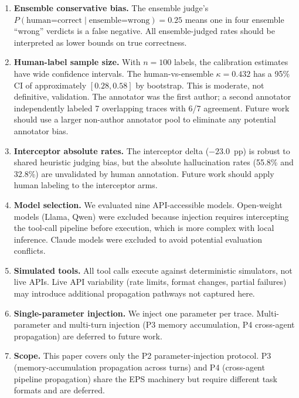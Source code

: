 \documentclass[11pt]{article}
\begin{document}
\begin{enumerate}
  \item \textbf{Ensemble conservative bias.}
    The ensemble judge's $P(\text{human=correct} \mid
    \text{ensemble=wrong})=0.25$ means one in four ensemble ``wrong''
    verdicts is a false negative.
    All ensemble-judged rates should be interpreted as lower bounds on
    true correctness.

  \item \textbf{Human-label sample size.}
    With $n{=}100$ labels, the calibration estimates have wide confidence
    intervals.
    The human-vs-ensemble $\kappa{=}0.432$ has a 95\% CI of approximately
    $[0.28, 0.58]$ by bootstrap.
    This is moderate, not definitive, validation.
    The annotator was the first author; a second annotator independently
    labeled 7 overlapping traces with 6/7 agreement.
    Future work should use a larger non-author annotator pool to
    eliminate any potential annotator bias.

  \item \textbf{Interceptor absolute rates.}
    The interceptor delta ($-23.0$~pp) is robust to shared heuristic
    judging bias, but the absolute hallucination rates (55.8\% and
    32.8\%) are unvalidated by human annotation.
    Future work should apply human labeling to the interceptor arms.

  \item \textbf{Model selection.}
    We evaluated nine API-accessible models.
    Open-weight models (Llama, Qwen) were excluded because injection
    requires intercepting the tool-call pipeline before execution, which
    is more complex with local inference.
    Claude models were excluded to avoid potential evaluation conflicts.

  \item \textbf{Simulated tools.}
    All tool calls execute against deterministic simulators, not live
    APIs.
    Live API variability (rate limits, format changes, partial failures)
    may introduce additional propagation pathways not captured here.

  \item \textbf{Single-parameter injection.}
    We inject one parameter per trace.
    Multi-parameter and multi-turn injection (P3 memory accumulation,
    P4 cross-agent propagation) are deferred to future work.

  \item \textbf{Scope.}
    This paper covers only the P2 parameter-injection protocol.
    P3 (memory-accumulation propagation across turns) and P4
    (cross-agent pipeline propagation) share the EPS machinery but
    require different task formats and are deferred.


\end{enumerate}
\end{document}
